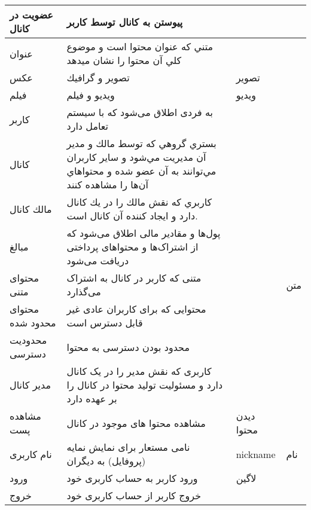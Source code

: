 \begin{table}[H]
    \centering
\begin{tabular}{|p{4cm}|p{4cm}|p{4cm}|p{4cm}|}
 عضويت در كانال& پيوستن به كانال توسط كاربر& & \\\hline
 عنوان& متني كه عنوان محتوا است و موضوع كلي آن محتوا را نشان ميدهد& & \\\hline
 عكس& تصوير و گرافيك& تصوير& \\\hline
 فيلم& ويديو و فيلم& ويديو& \\\hline
 كاربر& به فردی اطلاق می‌شود که با سیستم تعامل دارد& & \\\hline
 كانال& بستري گروهي كه توسط مالك و مدير آن مديريت مي‌شود و ساير كاربران مي‌توانند به آن عضو شده و محتواهاي آن‌ها را مشاهده كنند& & \\\hline
 مالك كانال& كاربري كه نقش مالك را در يك كانال دارد و ايجاد كننده آن كانال است.& & \\\hline
 مبالغ& پول‌ها و مقادیر مالی اطلاق می‌شود که از اشتراک‌ها و محتواهای پرداختی دریافت می‌شود& & \\\hline
 محتوای متنی & متنی که کاربر در کانال به اشتراک می‌گذارد &  &متن \\\hline
 محتوای محدود شده & محتوایی که برای کاربران عادی غیر قابل دسترس است & & \\\hline
 محدودیت دسترسی & محدود بودن دسترسی به محتوا & & \\\hline
 مدیر کانال & کاربری که نقش مدیر را در یک کانال دارد و مسئولیت تولید محتوا در کانال را بر عهده دارد & & \\\hline
 مشاهده پست & مشاهده محتوا های موجود در کانال & دیدن محتوا & \\\hline
 نام کاربری & نامی مستعار برای نمایش نمایه (پروفایل) به دیگران & nickname & نام \\\hline
 ورود & ورود کاربر به حساب کاربری خود & لاگین & \\\hline
 خروج & خروج کاربر از حساب کاربری خود & & \\\hline
 
    \end{tabular}
\end{table}
